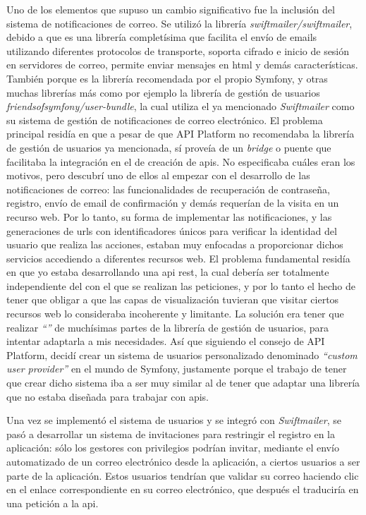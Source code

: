 Uno de los elementos que supuso un cambio significativo fue la inclusión del
sistema de notificaciones de correo. Se utilizó la librería \textit{swiftmailer/swiftmailer},
debido a que es una librería completísima que facilita el envío de emails utilizando
diferentes protocolos de transporte, soporta cifrado e inicio de sesión en
servidores de correo, permite enviar mensajes en \gls{html}\cite{swiftmailer_symfony} y demás
características. También porque es la librería recomendada por el propio 
Symfony, y otras muchas librerías más como por ejemplo la librería de gestión de usuarios
\textit{friendsofsymfony/user-bundle}, la cual utiliza el ya mencionado \textit{Swiftmailer} como
su sistema de gestión de notificaciones de correo electrónico. El problema principal residía en que
a pesar de que API Platform no recomendaba la librería de gestión de usuarios ya mencionada, sí
proveía de un \textit{bridge}\cite{apip_fosuser} o puente que facilitaba la integración en el 
de creación de \gls{api}s. No especificaba cuáles eran los motivos, pero descubrí
uno de ellos al empezar con el desarrollo de las notificaciones de correo: las
funcionalidades de recuperación de contraseña, registro, envío de email de confirmación
y demás requerían de la visita en un recurso web. Por lo tanto, su forma de implementar
las notificaciones, y las generaciones de \gls{url}s con identificadores únicos para
verificar la identidad del usuario que realiza las acciones, estaban muy enfocadas a
proporcionar dichos servicios accediendo a diferentes recursos web. El problema
fundamental residía en que yo estaba desarrollando una \gls{api} \gls{rest}, la
cual debería ser totalmente independiente del  con el
que se realizan las peticiones, y por lo tanto el hecho de tener que obligar a que
las capas de visualización tuvieran que visitar ciertos recursos web lo consideraba
incoherente y limitante. La solución era tener que realizar \textit{``''}
de muchísimas partes de la librería de gestión de usuarios, para intentar adaptarla a
mis necesidades. Así que siguiendo el consejo de API Platform, decidí crear un sistema
de usuarios personalizado \textemdash denominado \textit{``custom user provider''} en
el mundo de Symfony\textemdash, justamente porque el trabajo de tener que crear dicho
sistema iba a ser muy similar al de tener que adaptar una librería que no estaba diseñada
para trabajar con \gls{api}s.

Una vez se implementó el sistema de usuarios y se integró con \textit{Swiftmailer},
se pasó a desarrollar un sistema de invitaciones para restringir el registro en la
aplicación: sólo los gestores con privilegios podrían invitar, mediante el envío
automatizado de un correo electrónico desde la aplicación, a ciertos usuarios a ser
parte de la aplicación. Estos usuarios tendrían que validar su correo haciendo clic en
el enlace correspondiente en su correo electrónico, que después el 
traduciría en una petición a la \gls{api}.

